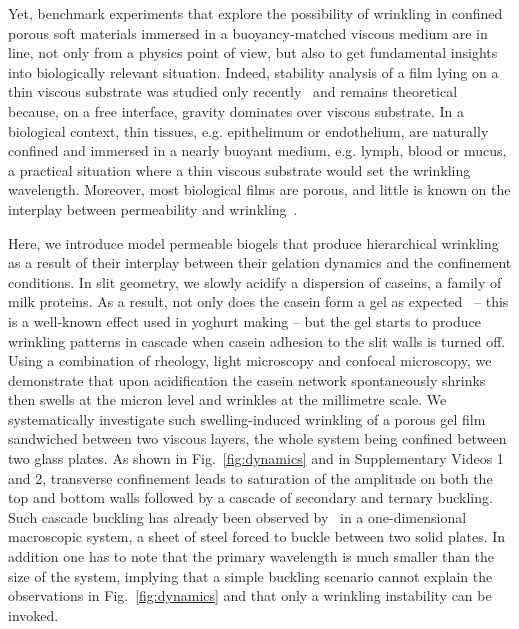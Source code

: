 \documentclass[twocolumn,superscriptaddress,showpacs,preprintnumbers,
amsmath,amssymb,prl]{revtex4-1}
\begin{document}


Yet, benchmark experiments that explore the possibility of wrinkling in confined porous soft materials immersed in a buoyancy-matched viscous medium are in line, not only from a physics point of view, but also to get fundamental insights into biologically relevant situation. Indeed, stability analysis of a film lying on a thin viscous substrate was studied only recently~\cite{Huang2002} and remains theoretical because, on a free interface, gravity dominates over viscous substrate. In a biological context, thin tissues, e.g. epithelimum or endothelium, are naturally confined and immersed in a nearly buoyant medium, e.g. lymph, blood or mucus, a practical situation where a thin viscous substrate would set the wrinkling wavelength. Moreover, most biological films are porous, and little is known on the interplay between permeability and wrinkling~\cite{Ma2004,Longley2013}.

Here, we introduce model permeable biogels that produce hierarchical wrinkling as a result of their interplay between their gelation dynamics and the confinement conditions. In slit geometry, we slowly acidify a dispersion of caseins, a family of milk proteins. As a result, not only does the casein form a gel as expected~\cite{Roefs1986,Bremer1989,Lucey1998} -- this is a well-known effect used in yoghurt making -- but the gel starts to produce wrinkling patterns in cascade when casein adhesion to the slit walls is turned off. Using a combination of rheology, light microscopy and confocal microscopy, we demonstrate that upon acidification the casein network spontaneously shrinks then swells at the micron level and wrinkles at the millimetre scale. We systematically investigate such swelling-induced wrinkling of a porous gel film sandwiched between two viscous layers, the whole system being confined between two glass plates. As shown in Fig.~\ref{fig:dynamics} and in Supplementary Videos 1 and 2, transverse confinement leads to saturation of the amplitude on both the top and bottom walls followed by a cascade of secondary and ternary buckling. Such cascade buckling has already been observed by~\cite{Roman1999} in a one-dimensional macroscopic system, a sheet of steel forced to buckle between two solid plates. In addition one has to note that the primary wavelength is much smaller than the size of the system, implying that a simple buckling scenario cannot explain the observations in Fig.~\ref{fig:dynamics} and that only a wrinkling instability can be invoked. 
\end{document}
